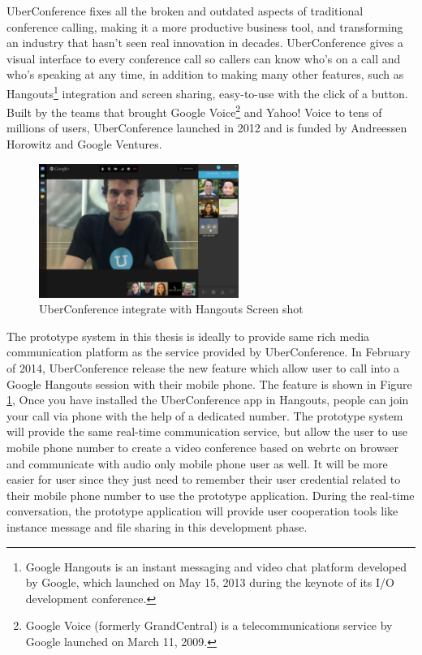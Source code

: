 \par UberConference fixes all the broken and outdated aspects of traditional conference calling, making it a more productive business tool, and transforming an industry that hasn't seen real innovation in decades. UberConference gives a visual interface to every conference call so callers can know who's on a call and who's speaking at any time, in addition to making many other features, such as Hangouts\footnote{Google Hangouts is an instant messaging and video chat platform developed by Google, which launched on May 15, 2013 during the keynote of its I/O development conference.\cite{wiki:hangouts}} integration and screen sharing, easy-to-use with the click of a button. Built by the teams that brought Google Voice\footnote{Google Voice (formerly GrandCentral) is a telecommunications service by Google launched on March 11, 2009.\cite{wiki:googleVoice}} and Yahoo! Voice to tens of millions of users, UberConference launched in 2012 and is funded by Andreessen Horowitz and Google Ventures.\cite{web:uberconference}

\begin{figure}
	\centering
    	\includegraphics[width=0.58\textwidth,natwidth=610,natheight=642]{figs/uberconference_hangout.jpg}
  	\caption{UberConference integrate with Hangouts Screen shot\cite{tnw:uberconference}}
  	\label{fig:uberconference}
\end{figure}

\par The prototype system in this thesis is ideally to provide same rich media communication platform as the service provided by UberConference. In February of 2014, UberConference release the new feature which allow user to call into a Google Hangouts session with their mobile phone. The feature is shown in Figure \ref{fig:uberconference}, Once you have installed the UberConference app in Hangouts, people can join your call via phone with the help of a dedicated number. The prototype system will provide the same real-time communication service, but allow the user to use mobile phone number to create a video conference based on \gls{webrtc} on browser and communicate with audio only mobile phone user as well. It will be more easier for user since they just need to remember their user credential related to their mobile phone number to use the prototype application. During the real-time conversation, the prototype application will provide user cooperation tools like instance message and file sharing in this development phase.

